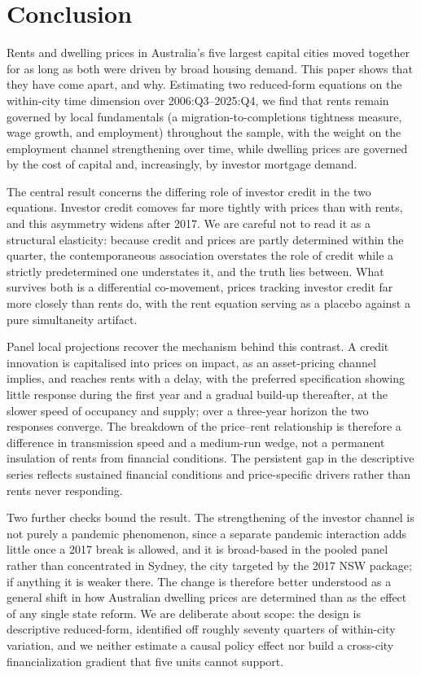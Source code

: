 \documentclass[preprint,11pt,authoryear]{elsarticle}
\begin{document}
\section{Conclusion}
\label{sec:conclusion}

Rents and dwelling prices in Australia's five largest capital cities
moved together for as long as both were driven by broad housing demand.
This paper shows that they have come apart, and why. Estimating two
reduced-form equations on the within-city time dimension over
2006:Q3--2025:Q4, we find that rents remain governed by local
fundamentals (a migration-to-completions tightness measure, wage
growth, and employment) throughout the sample, with the weight on the
employment channel strengthening over time, while
dwelling prices are governed by the cost of capital and, increasingly,
by investor mortgage demand.

The central result concerns the differing role of investor credit in
the two equations. Investor credit comoves far more tightly with prices
than with rents, and this asymmetry widens after 2017. We are careful
not to read it as a structural elasticity: because credit and prices
are partly determined within the quarter, the contemporaneous
association overstates the role of credit while a strictly predetermined
one understates it, and the truth lies between. What survives both is a
differential co-movement, prices tracking investor credit far more
closely than rents do, with the rent equation serving as a placebo
against a pure simultaneity artifact.

Panel local projections recover the mechanism behind this contrast. A
credit innovation is capitalised into prices on impact, as an
asset-pricing channel implies, and reaches rents with a delay, with the
preferred specification showing little response during the first year
and a gradual build-up thereafter, at the slower speed of occupancy and
supply; over a three-year horizon the two responses converge. The breakdown of the
price--rent relationship is therefore a difference in transmission
speed and a medium-run wedge, not a permanent insulation of rents from
financial conditions. The persistent gap in the descriptive series
reflects sustained financial conditions and price-specific drivers
rather than rents never responding.

Two further checks bound the result. The strengthening of the investor
channel is not purely a pandemic phenomenon, since a separate pandemic
interaction adds little once a 2017 break is allowed, and it is
broad-based in the pooled panel rather than concentrated in Sydney, the city
targeted by the 2017 NSW package; if anything it is weaker there. The
change is therefore better understood as a general shift in how
Australian dwelling prices are determined than as the effect of any
single state reform. We are deliberate about scope: the design is descriptive
reduced-form, identified off roughly seventy quarters of within-city
variation, and we neither estimate a causal policy effect nor build a
cross-city financialization gradient that five units cannot support.
\end{document}
